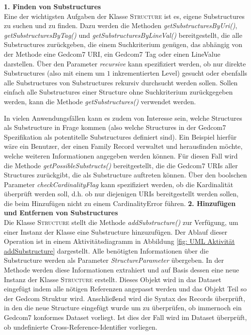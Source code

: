 \vspace{1em}
\textbf{1. Finden von Substructures} \vspace{0.5em} \\
Eine der wichtigsten Aufgaben der Klasse \textsc{Structure} ist es, eigene Substructures zu suchen und zu finden. Dazu werden die Methoden \textit{getSubstructuresByUri()}, \textit{getSubstructuresByTag()} und \textit{getSubstructuresByLineVal()} bereitgestellt, die alle Substructures zurückgeben, die einem Suchkriterium genügen, das abhängig von der Methode eine Gedcom7 URI, ein Gedcom7 Tag oder einen LineValue darstellen. Über den Parameter \textit{recursive} kann spezifiziert werden, ob nur direkte Substructures (also mit einem um $1$ inkrementierten Level) gesucht oder ebenfalls alle Substructures von Substructures rekursiv durchsucht werden sollen. Sollen einfach alle Substructures einer Structure ohne Suchkriterium zurückgegeben werden, kann die Methode \textit{getSubstructures()} verwendet werden.


In vielen Anwendungsfällen kann es zudem von Interesse sein, welche Structures als Substructure in Frage kommen (also welche Structures in der Gedcom7 Spezifikation als potentitelle Substructures definiert sind). Ein Beispiel hierfür wäre ein Benutzer, der einen Family Record verwaltet und herausfinden möchte, welche weiteren Informationen angegeben werden können. Für diesen Fall wird die Methode \textit{getPossibleSubstructs()} bereitgestellt, die die Gedcom7 URIs aller Structures zurückgibt, die als Substructure auftreten können. Über den boolschen Parameter \textit{checkCardinalityFlag} kann spezifiziert werden, ob die Kardinalität überprüft werden soll, d.h. ob nur diejenigen URIs bereitgestellt werden sollen, die beim Hinzufügen nicht zu einem CardinalityError führen. 
\newpage
\vspace{1em}
\textbf{2. Hinzufügen und Entfernen von Substructures} \vspace{0.5em} \\
Die Klasse \textsc{Structure} stellt die Methode \textit{addSubstructure()} zur Verfügung, um einer Instanz der Klasse eine Substructure hinzuzufügen. Der Ablauf dieser Operation ist in einem Aktivitätsdiagramm in Abbildung \ref{fig: UML Aktivität addSubstructure} dargestellt. Alle benötigten Informationen über die Substructure werden als Parameter \textit{StructureParameter} übergeben. In der Methode werden diese Informationen extrahiert und auf Basis dessen eine neue Instanz der Klasse \textsc{Structure} erstellt. Dieses Objekt wird in das Dataset eingefügt indem alle nötigen Referenzen angepasst werden und das Objekt Teil so der Gedcom Struktur wird. Anschließend wird die Syntax des Records überprüft, in den die neue Structure eingefügt wurde um zu überprüfen, ob immernoch ein Gedcom7 konformes Dataset vorliegt. Ist dies der Fall wird im Dataset überprüft, ob undefinierte Cross-Reference-Identifier vorliegen. 


